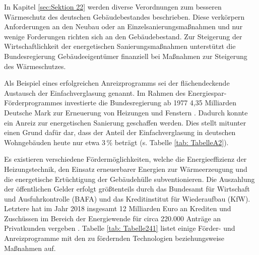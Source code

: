 In Kapitel \ref{sec:Sektion 22} werden diverse Verordnungen zum besseren Wärmeschutz des deutschen Gebäudebestandes beschrieben.
Diese verkörpern Anforderungen an den Neubau oder an Einzelsanierungsmaßnahmen und nur wenige Forderungen richten sich an den Gebäudebestand.
Zur Steigerung der Wirtschaftlichkeit der energetischen Sanierungsmaßnahmen unterstützt die Bundesregierung Gebäudeeigentümer finanziell bei Maßnahmen zur Steigerung des Wärmeschutzes.

Als Beispiel eines erfolgreichen Anreizprogramms sei der flächendeckende Austausch der Einfachverglasung genannt.
Im Rahmen des Energiespar-Förderprogrammes investierte die Bundesregierung ab 1977 4,35 Milliarden Deutsche Mark zur Erneuerung von Heizungen und Fenstern \cite{EickeHenning.2011b}.
Dadurch konnte ein Anreiz zur energetischen Sanierung geschaffen werden.
Dies stellt mitunter einen Grund dafür dar, dass der Anteil der Einfachverglasung in deutschen Wohngebäuden heute nur etwa 3\,\% beträgt (s. Tabelle \ref{tab: TabelleA2}).

Es existieren verschiedene Fördermöglichkeiten, welche die Energieeffizienz der Heizungstechnik, den Einsatz erneuerbarer Energien zur Wärmeerzeugung und die energetische Ertüchtigung der Gebäudehülle subventionieren.
Die Auszahlung der öffentlichen Gelder erfolgt größtenteils durch das Bundesamt für Wirtschaft und Ausfuhrkontrolle (BAFA) und das Kreditinstitut für Wiederaufbau (KfW).
Letztere hat im Jahr 2018 insgesamt 12 Milliarden Euro an Krediten und Zuschüssen im Bereich der Energiewende für circa 220.000 Anträge an Privatkunden vergeben \cite{KfW_Report18}. 
Tabelle \ref{tab: Tabelle241} listet einige Förder- und Anreizprogramme mit den zu fördernden Technologien beziehungsweise Maßnahmen auf.

